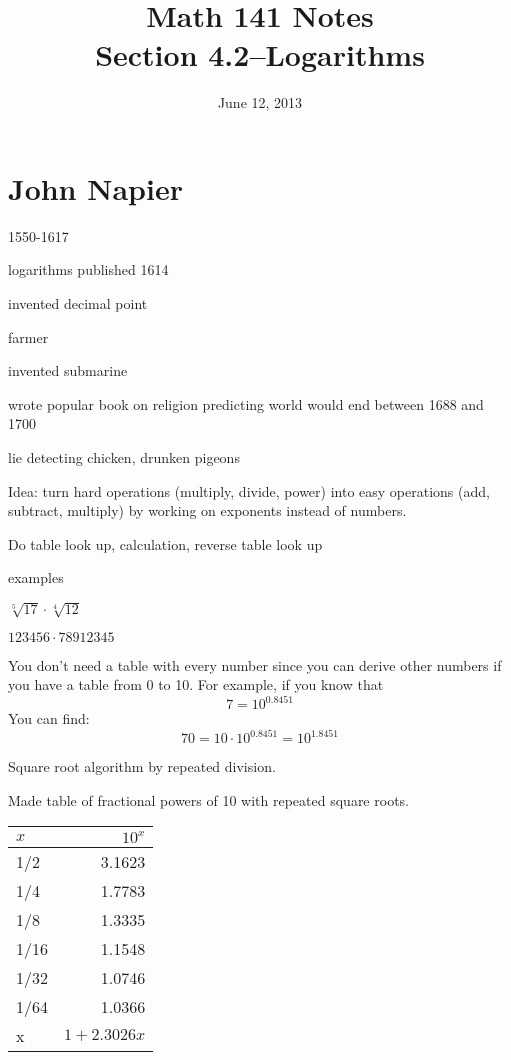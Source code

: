 \documentclass{exam}
\title{Math 141 Notes \\ Section 4.2--Logarithms}
\date{June 12, 2013}
\begin{document}
  \maketitle
  \tableofcontents

  \section{John Napier}

  \begin{itemize*}
    \item 1550-1617
    \item logarithms published 1614
    \item invented decimal point
    \item farmer
    \item invented submarine
    \item wrote popular book on religion predicting world would end between 1688 and 1700
    \item lie detecting chicken, drunken pigeons
  \end{itemize*}

  Idea: turn hard operations (multiply, divide, power) into easy operations (add, subtract, multiply) by working on
  exponents instead of numbers.

  Do table look up, calculation, reverse table look up

  examples 
  \begin{itemize*}
    \item $\sqrt[5]{17} \cdot \sqrt[4]{12}$
    \item $123456 \cdot 78912345$
  \end{itemize*}

  You don't need a table with every number since you can derive other numbers if you have a table from 0 to 10.  For
  example, if you know that 
  \[
    7 = 10^{0.8451}
  \]
  You can find:
  \[
    70 = 10 \cdot 10^{0.8451} = 10^{1.8451}
  \]

  Square root algorithm by repeated division.

  Made table of fractional powers of 10 with repeated square roots.

  \begin{tabular}[H]{lr}
    \toprule
    $x$ & $10^x$ \\
    \midrule
    1/2 & 3.1623 \\
    1/4 & 1.7783 \\
    1/8 & 1.3335 \\
    1/16 & 1.1548 \\
    1/32 & 1.0746 \\
    1/64 & 1.0366 \\
    x & $1 + 2.3026x$ \\
    \bottomrule
  \end{tabular}
\end{document}
